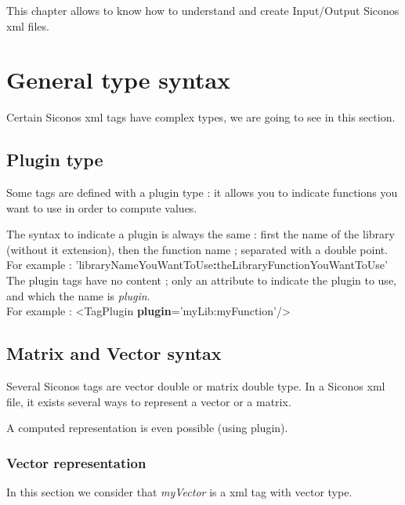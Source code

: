This chapter allows to know how to understand and create Input/Output Siconos \ac{xml} files.

\section{General type syntax}
Certain Siconos \ac{xml} tags have complex types, we are going to see in this section.

\subsection{Plugin type}
Some tags are defined with a plugin type : it allows you to indicate functions you want to use in order to compute values.

The syntax to indicate a plugin is always the same : first the name of the library (without it extension), then the function
name ; separated with a double point.\\
For example : 'libraryNameYouWantToUse\textbf{:}theLibraryFunctionYouWantToUse'\\

The plugin tags have no content ; only an attribute to indicate the plugin to use, and which the name is \textit{plugin}.\\

For example : <TagPlugin \textbf{plugin}='myLib:myFunction'/>\\


\subsection{Matrix and Vector syntax}

Several Siconos tags are vector double or matrix double type. In a Siconos \ac{xml} file, it exists several ways to represent a vector or a matrix. 
 
A computed representation is even possible (using plugin).\\


\subsubsection{Vector representation}

In this section we consider that \textit{myVector} is a \ac{xml} tag with vector type.\\

